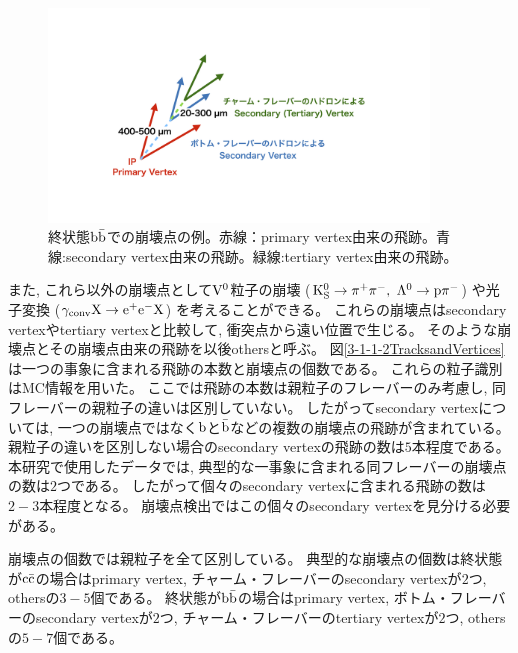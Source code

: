 \begin{figure}[htbp]
 \centering
 \includegraphics[trim = 200 200 200 200, width=0.9\textwidth, clip]{Figure/3Networks/3-1-1-1FinalStateBB.png}
 \caption[終状態$\rm b\bar{b}$での崩壊点の例]{終状態$\rm b\bar{b}$での崩壊点の例。赤線：primary vertex由来の飛跡。青線:secondary vertex由来の飛跡。緑線:tertiary vertex由来の飛跡。}
 \label{3-1-1-1FinalStateBB}
\end{figure}

また, これら以外の崩壊点として$\rm V^0$粒子の崩壊 ($\rm K^0_S \to \pi^+\pi^-,\ \Lambda^0 \to p \pi^-$) や光子変換 ($\rm \gamma_{conv} X \to e^+e^-X$) を考えることができる。
これらの崩壊点はsecondary vertexやtertiary vertexと比較して, 衝突点から遠い位置で生じる。
そのような崩壊点とその崩壊点由来の飛跡を以後othersと呼ぶ。
図\ref{3-1-1-2TracksandVertices}は一つの事象に含まれる飛跡の本数と崩壊点の個数である。
これらの粒子識別はMC情報を用いた。
ここでは飛跡の本数は親粒子のフレーバーのみ考慮し, 同フレーバーの親粒子の違いは区別していない。
したがってsecondary vertexについては, 一つの崩壊点ではなく$\rm b$と$\rm \bar{b}$などの複数の崩壊点の飛跡が含まれている。
親粒子の違いを区別しない場合のsecondary vertexの飛跡の数は$5$本程度である。
本研究で使用したデータでは, 典型的な一事象に含まれる同フレーバーの崩壊点の数は$2$つである。
したがって個々のsecondary vertexに含まれる飛跡の数は$2-3$本程度となる。
崩壊点検出ではこの個々のsecondary vertexを見分ける必要がある。

崩壊点の個数では親粒子を全て区別している。
典型的な崩壊点の個数は終状態が$\rm c\bar{c}$の場合はprimary vertex, チャーム・フレーバーのsecondary vertexが$2$つ, othersの$3-5$個である。
終状態が$\rm b\bar{b}$の場合はprimary vertex, ボトム・フレーバーのsecondary vertexが$2$つ, チャーム・フレーバーのtertiary vertexが$2$つ, othersの$5-7$個である。

